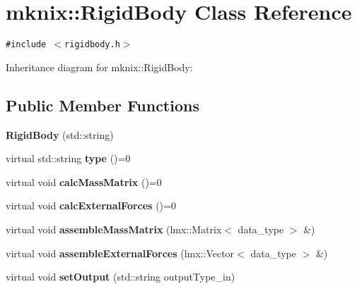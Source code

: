 \hypertarget{classmknix_1_1RigidBody}{
\section{mknix::RigidBody Class Reference}
\label{classmknix_1_1RigidBody}
}
{\tt \#include $<$rigidbody.h$>$}

Inheritance diagram for mknix::RigidBody:\subsection*{Public Member Functions}
\begin{CompactItemize}
\item 
\hypertarget{classmknix_1_1RigidBody_2b343858ebee91bb44df59d7a19a5f10}{
\textbf{RigidBody} (std::string)}
\label{classmknix_1_1RigidBody_2b343858ebee91bb44df59d7a19a5f10}

\item 
\hypertarget{classmknix_1_1RigidBody_6ef33691ca84f7032b5ecb3af7b98de7}{
virtual std::string \textbf{type} ()=0}
\label{classmknix_1_1RigidBody_6ef33691ca84f7032b5ecb3af7b98de7}

\item 
\hypertarget{classmknix_1_1RigidBody_769f69b9be55d83e58acdae1d32d852f}{
virtual void \textbf{calcMassMatrix} ()=0}
\label{classmknix_1_1RigidBody_769f69b9be55d83e58acdae1d32d852f}

\item 
\hypertarget{classmknix_1_1RigidBody_d8978297c918e68b9dc21e88e62027ce}{
virtual void \textbf{calcExternalForces} ()=0}
\label{classmknix_1_1RigidBody_d8978297c918e68b9dc21e88e62027ce}

\item 
\hypertarget{classmknix_1_1RigidBody_c20200b40e6e222261bb8257e339d7b4}{
virtual void \textbf{assembleMassMatrix} (lmx::Matrix$<$ data\_\-type $>$ \&)}
\label{classmknix_1_1RigidBody_c20200b40e6e222261bb8257e339d7b4}

\item 
\hypertarget{classmknix_1_1RigidBody_18c7ffa5b9f2d3df008a92f421404fac}{
virtual void \textbf{assembleExternalForces} (lmx::Vector$<$ data\_\-type $>$ \&)}
\label{classmknix_1_1RigidBody_18c7ffa5b9f2d3df008a92f421404fac}

\item 
\hypertarget{classmknix_1_1RigidBody_eb0e59ca0bac1a7b2a1f7cba7d210a59}{
virtual void \textbf{setOutput} (std::string outputType\_\-in)}
\label{classmknix_1_1RigidBody_eb0e59ca0bac1a7b2a1f7cba7d210a59}


\end{CompactItemize}
